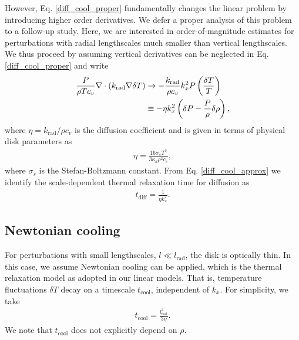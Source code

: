 However, Eq. \ref{diff_cool_proper} fundamentally changes the linear
problem by introducing higher order derivatives. We defer a proper
analysis of this problem to a follow-up study. Here, we are interested
in order-of-magnitude estimates for perturbations with radial
lengthscales much smaller than vertical lengthscales. We thus proceed 
by assuming vertical derivatives can be neglected in 
Eq. \ref{diff_cool_proper} and write  
\begin{align}\label{diff_cool_approx}
  \frac{P}{\rho T c_v} \nabla\cdot\left(k_\mathrm{rad}\nabla\delta
    T\right) &\to -\frac{k_\mathrm{rad}}{\rho
    c_v}k_x^2P\left(\frac{\delta T}{T}\right)\notag\\
  &\equiv -\eta k_x^2 \left(\delta P - \frac{P}{\rho}\delta\rho\right), 
\end{align}
 where $\eta=k_\mathrm{rad}/\rho c_v$ is
the diffusion coefficient and 
is given in terms of physical disk parameters as 
\begin{align}\label{eta_def}
  \eta = \frac{16\sigma_s T^3}{3\kappa_d\rho^2 c_v}, 
\end{align}
where $\sigma_s$ is the Stefan-Boltzmann constant. 
From Eq. \ref{diff_cool_approx} we identify the scale-dependent thermal relaxation
time for diffusion as 
\begin{align}\label{tc_diff_cool} 
  t_\mathrm{diff} = \frac{1}{\eta k_x^2}.%
\end{align}

\subsection{Newtonian cooling}\label{newton_cool}
For perturbations with small lengthscales, $l\ll l_\mathrm{rad}$, 
the disk is optically thin. In this case, we assume 
Newtonian cooling can be applied, which is the thermal
relaxation model as adopted in our linear models. That is, temperature
fluctuations $\delta T$ decay on a timescale $t_\mathrm{cool}$,
independent of $k_x$. For simplicity, we take  
\begin{align}
  t_\mathrm{cool} = \frac{l_\mathrm{rad}^2}{3\eta}. 
\end{align}
We note that $t_\mathrm{cool}$ does not explicitly depend on $\rho$. 

